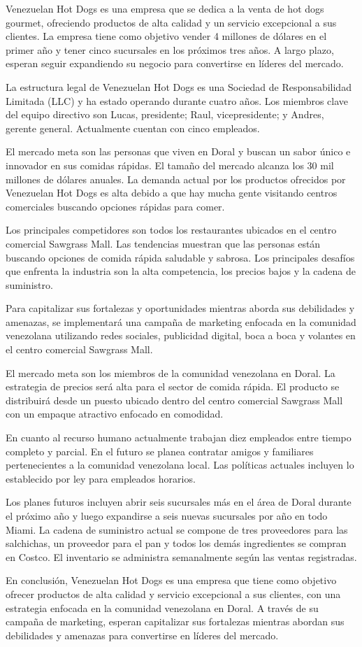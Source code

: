 Venezuelan Hot Dogs es una empresa que se dedica a la venta de hot dogs gourmet, ofreciendo productos de alta calidad y un servicio excepcional a sus clientes. La empresa tiene como objetivo vender 4 millones de dólares en el primer año y tener cinco sucursales en los próximos tres años. A largo plazo, esperan seguir expandiendo su negocio para convertirse en líderes del mercado.

La estructura legal de Venezuelan Hot Dogs es una Sociedad de Responsabilidad Limitada (LLC) y ha estado operando durante cuatro años. Los miembros clave del equipo directivo son Lucas, presidente; Raul, vicepresidente; y Andres, gerente general. Actualmente cuentan con cinco empleados.

El mercado meta son las personas que viven en Doral y buscan un sabor único e innovador en sus comidas rápidas. El tamaño del mercado alcanza los 30 mil millones de dólares anuales. La demanda actual por los productos ofrecidos por Venezuelan Hot Dogs es alta debido a que hay mucha gente visitando centros comerciales buscando opciones rápidas para comer.

Los principales competidores son todos los restaurantes ubicados en el centro comercial Sawgrass Mall. Las tendencias muestran que las personas están buscando opciones de comida rápida saludable y sabrosa. Los principales desafíos que enfrenta la industria son la alta competencia, los precios bajos y la cadena de suministro.

Para capitalizar sus fortalezas y oportunidades mientras aborda sus debilidades y amenazas, se implementará una campaña de marketing enfocada en la comunidad venezolana utilizando redes sociales, publicidad digital, boca a boca y volantes en el centro comercial Sawgrass Mall.

El mercado meta son los miembros de la comunidad venezolana en Doral. La estrategia de precios será alta para el sector de comida rápida. El producto se distribuirá desde un puesto ubicado dentro del centro comercial Sawgrass Mall con un empaque atractivo enfocado en comodidad.

En cuanto al recurso humano actualmente trabajan diez empleados entre tiempo completo y parcial. En el futuro se planea contratar amigos y familiares pertenecientes a la comunidad venezolana local. Las políticas actuales incluyen lo establecido por ley para empleados horarios.

Los planes futuros incluyen abrir seis sucursales más en el área de Doral durante el próximo año y luego expandirse a seis nuevas sucursales por año en todo Miami. La cadena de suministro actual se compone de tres proveedores para las salchichas, un proveedor para el pan y todos los demás ingredientes se compran en Costco. El inventario se administra semanalmente según las ventas registradas.

En conclusión, Venezuelan Hot Dogs es una empresa que tiene como objetivo ofrecer productos de alta calidad y servicio excepcional a sus clientes, con una estrategia enfocada en la comunidad venezolana en Doral. A través de su campaña de marketing, esperan capitalizar sus fortalezas mientras abordan sus debilidades y amenazas para convertirse en líderes del mercado.